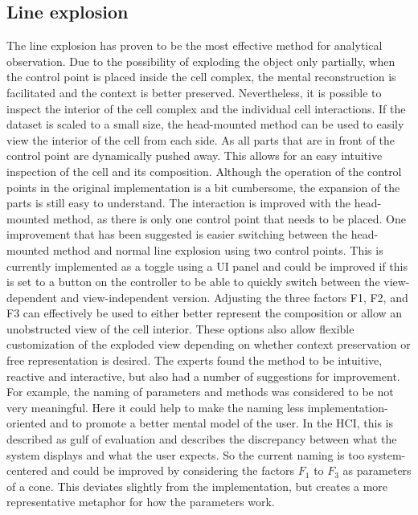 \subsection{Line explosion}
The line explosion has proven to be the most effective method for analytical observation. Due to the possibility of exploding the object only partially, when the control point is placed inside the cell complex, the mental reconstruction is facilitated and the context is better preserved.
Nevertheless, it is possible to inspect the interior of the cell complex and the individual cell interactions. If the dataset is scaled to a small size, the head-mounted method can be used to easily view the interior of the cell from each side. As all parts that are in front of the control point are dynamically pushed away. This allows for an easy intuitive inspection of the cell and its composition. Although the operation of the control points in the original implementation is a bit cumbersome, the expansion of the parts is still easy to understand. The interaction is improved with the head-mounted method, as there is only one control point that needs to be placed. One improvement that has been suggested is easier switching between the head-mounted method and normal line explosion using two control points. 
This is currently implemented as a toggle using a UI panel and could be improved if this is set to a button on the controller to be able to quickly switch between the view-dependent and view-independent version. Adjusting the three factors F1, F2, and F3 can effectively be used to either better represent the composition or allow an unobstructed view of the cell interior. These options also allow flexible customization of the exploded view depending on whether context preservation or free representation is desired. The experts found the method to be intuitive, reactive and interactive, but also had a number of suggestions for improvement. For example, the naming of parameters and methods was considered to be not very meaningful. Here it could help to make the naming less implementation-oriented and to promote a better mental model of the user. In the HCI, this is described as gulf of evaluation and describes the discrepancy between what the system displays and what the user expects. So the current naming is too system-centered and could be improved by considering the factors $F_1$ to $F_3$ as parameters of a cone. This deviates slightly from the implementation, but creates a more representative metaphor for how the parameters work.

